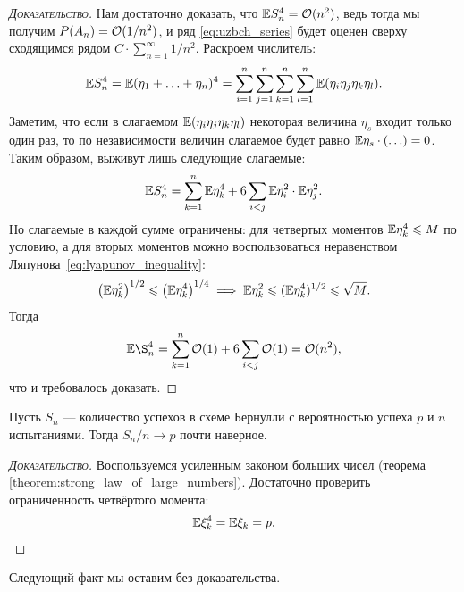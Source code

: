 \documentclass[../main.tex]{subfiles}
\begin{document}
\begin{proof}[\normalfont\textsc{Доказательство}]
 Нам достаточно доказать, что $ \mathbb E S_n^{4} = \mathcal{O}(n^{2}) $, ведь тогда мы получим $ P(A_n) = \mathcal{O}(1 / n^{2})$, и ряд \eqref{eq:uzbch_series} будет оценен сверху сходящимся рядом $ C \cdot \sum_{n=1}^{\infty} 1/n^{2}$. Раскроем числитель:
 \begin{align*}
  \mathbb E S_n^{4} = \mathbb E (\eta_1 + \ldots + \eta_n)^{4} = \sum_{i=1}^{n} \sum_{j=1}^{n} \sum_{k=1}^{n} \sum_{l=1}^{n} \mathbb E (\eta_i \eta_j \eta_k \eta_l).
 \end{align*} Заметим, что если в слагаемом $ \mathbb E(\eta_i \eta_j \eta_k \eta_l) $ некоторая величина $ \eta_s $ входит только один раз, то по независимости величин слагаемое будет равно $ \mathbb E \eta_s \cdot (\ldots) = 0 $. Таким образом, выживут лишь следующие слагаемые:
 \begin{align*}
  \mathbb E S_n^{4} = \sum_{k=1}^{n}\mathbb E\eta_k^{4} + 6 \sum_{i < j} \mathbb E\eta_i^{2} \cdot \mathbb E\eta_j^{2}.
 \end{align*} Но слагаемые в каждой сумме ограничены: для четвертых моментов $ \mathbb E\eta_k^{4} \leqslant M $ по условию, а для вторых моментов можно воспользоваться неравенством Ляпунова~\eqref{eq:lyapunov_inequality}:
 \begin{align*}
  \left(\mathbb E \eta_k^{2} \right)^{1 / 2} \leqslant \left( \mathbb E\eta_k^{4} \right)^{1 / 4} \implies \mathbb E\eta_k^{2} \leqslant (\mathbb E\eta_k^{4})^{1 / 2} \leqslant \sqrt M.
 \end{align*} Тогда
 \begin{align*}
  \E\S_n^{4} = \sum_{k=1}^{n} \OO(1) + 6 \sum_{i < j} \OO(1) = \OO(n^{2}),
 \end{align*} что и требовалось доказать.
\end{proof}

\begin{crly}
 \label{strong_law_of_large_numbers_for_bernoulli_scheme}
 Пусть $ S_n $ --- количество успехов в схеме Бернулли с вероятностью успеха  $ p $ и  $ n $ испытаниями. Тогда $ S_n/n \to p $  почти наверное.
\end{crly}
\begin{proof}[\normalfont\textsc{Доказательство}]
 Воспользуемся усиленным законом больших чисел (теорема \ref{theorem:strong_law_of_large_numbers}). Достаточно проверить ограниченность четвёртого момента:
 \begin{align*}
  \mathbb E \xi_k^{4} = \mathbb E \xi_k = p.
 \end{align*}
\end{proof}

Следующий факт мы оставим без доказательства.
\end{document}
